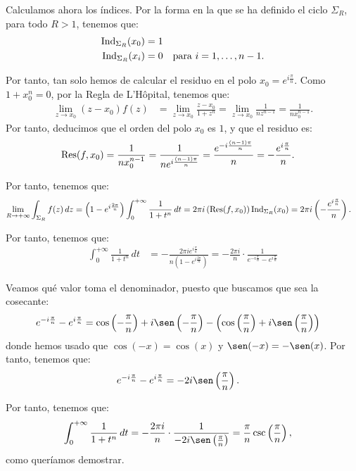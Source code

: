 \begin{ejercicio}
    Calculamos ahora los índices. Por la forma en la que se ha definido el ciclo $\Sigma_R$, para todo $R > 1$, tenemos que:
    \begin{align*}
        \operatorname{Ind}_{\Sigma_R}(x_0) &= 1\\
        \operatorname{Ind}_{\Sigma_R}(x_i) &= 0 \quad \text{para } i=1, \ldots, n-1.
    \end{align*}

    Por tanto, tan solo hemos de calcular el residuo en el polo $x_0 = e^{i\frac{\pi}{n}}$. Como $1+x_0^n = 0$, por la Regla de L'Hôpital, tenemos que:
    \begin{align*}
        \lim_{z\to x_0} (z - x_0)f(z) &= \lim_{z\to x_0} \frac{z - x_0}{1 + z^n}
        = \lim_{z\to x_0} \frac{1}{n z^{n-1}} = \frac{1}{n x_0^{n-1}}.
    \end{align*}
    Por tanto, deducimos que el orden del polo $x_0$ es $1$, y que el residuo es:
    \begin{align*}
        \operatorname{Res}(f, x_0) &= \frac{1}{n x_0^{n-1}} = \frac{1}{n e^{i\frac{(n-1)\pi}{n}}} = \frac{e^{-i\frac{(n-1)\pi}{n}}}{n}
        = -\frac{e^{i\frac{\pi}{n}}}{n}.
    \end{align*}

    Por tanto, tenemos que:
    \begin{align*}
        \lim_{R\to+\infty} \int_{\Sigma_R} f(z) \, dz &= \left(1 - e^{i\frac{2\pi}{n}}\right)\int_{0}^{+\infty} \frac{1}{1 + t^n} \, dt
        = 2\pi i\left(\operatorname{Res}(f, x_0)\right)\operatorname{Ind}_{\Sigma_R}(x_0)
        = 2\pi i\left(-\frac{e^{i\frac{\pi}{n}}}{n}\right).
    \end{align*}

    Por tanto, tenemos que:
    \begin{align*}
        \int_{0}^{+\infty} \frac{1}{1 + t^n} \, dt &= -\frac{2\pi i e^{i\frac{\pi}{n}}}{n\left(1 - e^{i\frac{2\pi}{n}}\right)}
        = -\frac{2\pi i}{n} \cdot \frac{1}{e^{-i\frac{\pi}{n}} - e^{i\frac{\pi}{n}}}
    \end{align*}

    Veamos qué valor toma el denominador, puesto que buscamos que sea la cosecante:
    \begin{align*}
        e^{-i\frac{\pi}{n}} - e^{i\frac{\pi}{n}} &= \cos\left(-\frac{\pi}{n}\right) + i\sen\left(-\frac{\pi}{n}\right) - \left(\cos\left(\frac{\pi}{n}\right) + i\sen\left(\frac{\pi}{n}\right)\right)
    \end{align*}
    donde hemos usado que $\cos(-x) = \cos(x)$ y $\sen(-x) = -\sen(x)$. Por tanto, tenemos que:
    \begin{align*}
        e^{-i\frac{\pi}{n}} - e^{i\frac{\pi}{n}} &= -2i\sen\left(\frac{\pi}{n}\right).
    \end{align*}

    Por tanto, tenemos que:
    \begin{align*}
        \int_{0}^{+\infty} \frac{1}{1 + t^n} \, dt &= -\frac{2\pi i}{n} \cdot \frac{1}{-2i\sen\left(\frac{\pi}{n}\right)}
        = \frac{\pi}{n}\csc\left(\frac{\pi}{n}\right),
    \end{align*}
    como queríamos demostrar.
\end{ejercicio}

